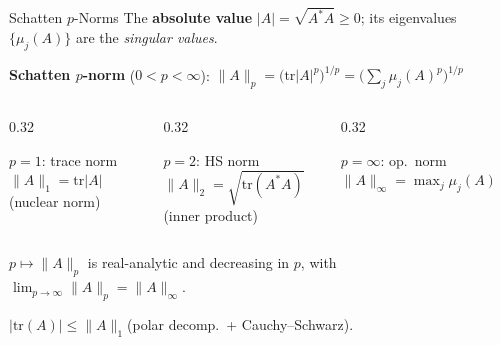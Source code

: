 \documentclass{beamer}
\newcommand{\tr}{\mathrm{tr}}
\newcommand{\norm}[1]{\|#1\|}
\begin{document}
\begin{frame}[shrink=10]{Schatten $p$-Norms}
  \small
  The \textbf{absolute value} $|A|=\sqrt{A^*A}\ge 0$; its eigenvalues
  $\{\mu_j(A)\}$ are the \emph{singular values}.

  \begin{tcolorbox}[mathbox, left=3pt, right=3pt, top=1pt, bottom=1pt]
    \textbf{Schatten $p$-norm} ($0<p<\infty$):\quad
    $\norm{A}_p = \bigl(\tr|A|^p\bigr)^{1/p} = \bigl(\sum_j\mu_j(A)^p\bigr)^{1/p}$
  \end{tcolorbox}

  \begin{columns}[T]
    \begin{column}{0.32\textwidth}
      \begin{block}{$p=1$: trace norm}
        $\norm{A}_1=\tr|A|$ \\(nuclear norm)
      \end{block}
    \end{column}
    \begin{column}{0.32\textwidth}
      \begin{block}{$p=2$: HS norm}
        $\norm{A}_2=\sqrt{\tr(A^*A)}$ \\(inner product)
      \end{block}
    \end{column}
    \begin{column}{0.32\textwidth}
      \begin{block}{$p=\infty$: op.\ norm}
        $\norm{A}_\infty=\max_j\mu_j(A)$
      \end{block}
    \end{column}
  \end{columns}

  \vspace{0.2em}
  $p\mapsto\norm{A}_p$ is real-analytic and decreasing in $p$, with
  $\lim_{p\to\infty}\norm{A}_p=\norm{A}_\infty$.

  \vspace{0.2em}
  \begin{tcolorbox}[mathbox, left=3pt, right=3pt, top=1pt, bottom=1pt]
    $|\tr(A)| \le \norm{A}_1$\quad (polar decomp.\ + Cauchy--Schwarz).
  \end{tcolorbox}
\end{frame}
\end{document}
